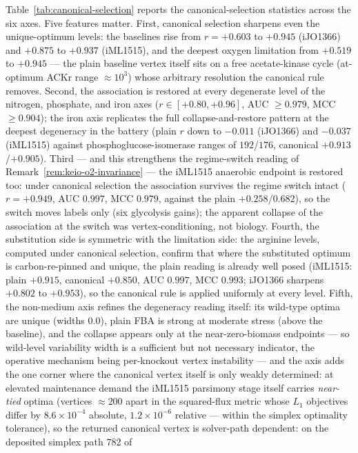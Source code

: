 \documentclass[11pt,a4paper]{article}
\theoremstyle{plain}
\theoremstyle{definition}
\theoremstyle{remark}
\begin{document}
Table~\ref{tab:canonical-selection} reports the
canonical-selection statistics across the six axes. Five features matter. First, canonical selection
sharpens even the unique-optimum levels: the baselines rise from
$r=+0.603$ to $+0.945$ (iJO1366) and $+0.875$ to $+0.937$ (iML1515),
and the deepest oxygen limitation from $+0.519$ to $+0.945$ --- the
plain baseline vertex itself sits on a free acetate-kinase cycle
(at-optimum ACKr range $\approx 10^{3}$) whose arbitrary resolution
the canonical rule removes. Second, the association is restored at
every degenerate level of the nitrogen, phosphate, and iron axes
($r\in[+0.80,+0.96]$, AUC $\ge 0.979$, MCC $\ge 0.904$); the
iron axis replicates the full collapse-and-restore pattern at the
deepest degeneracy in the battery (plain $r$ down to $-0.011$
(iJO1366) and $-0.037$ (iML1515) against
phosphoglucose-isomerase ranges of $192$/$176$, canonical
$+0.913$/$+0.905$). Third ---
and this strengthens the regime-switch reading of
Remark~\ref{rem:keio-o2-invariance} --- the iML1515 anaerobic
endpoint is restored too: under canonical selection the association
survives the regime switch intact ($r=+0.949$, AUC $0.997$, MCC
$0.979$, against the plain $+0.258$/$0.682$), so the switch moves
labels only (six glycolysis gains); the apparent collapse of the
association at the switch was vertex-conditioning, not biology.
Fourth, the substitution side is symmetric with the limitation
side: the arginine levels, computed under canonical selection,
confirm that where the substituted optimum is carbon-re-pinned and
unique, the plain reading is already well posed (iML1515: plain
$+0.915$, canonical $+0.850$, AUC $0.997$, MCC $0.993$; iJO1366
sharpens $+0.802$ to $+0.953$), so the canonical rule is applied
uniformly at every level. Fifth, the non-medium axis refines the degeneracy
reading itself: its wild-type optima are unique (widths $0.0$),
plain FBA is strong at moderate stress (above the baseline), and
the collapse appears only at the near-zero-biomass endpoints ---
so wild-level variability width is a sufficient but not necessary
indicator, the operative mechanism being per-knockout vertex
instability --- and the axis adds the one corner where the
canonical vertex itself is only weakly determined: at elevated
maintenance demand the iML1515 parsimony stage itself carries
\emph{near-tied} optima (vertices $\approx200$ apart in the
squared-flux metric whose $L_1$ objectives differ by
$8.6\times10^{-4}$ absolute, $1.2\times10^{-6}$ relative --- within
the simplex optimality tolerance), so the returned canonical vertex
is solver-path dependent: on the deposited simplex path $782$ of
\end{document}
